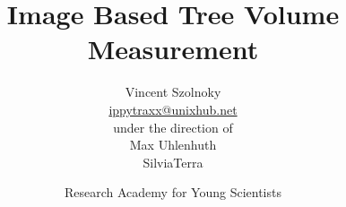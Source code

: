 

\title{
Image Based Tree Volume Measurement
}

\author{
Vincent Szolnoky\\
\url{ippytraxx@unixhub.net}
\vspace{0.5in}\\
under the direction of\\
Max Uhlenhuth\\
SilviaTerra
\vspace{1in}
}


\date{
Research Academy for Young Scientists\\
\raysfinalpaperdate
}
